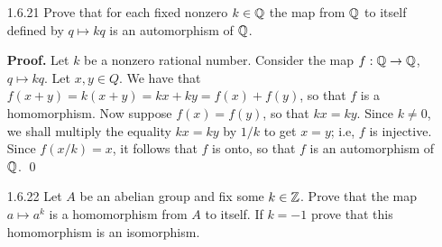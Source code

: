 \begin{enumerate}
      \textbf{Proof.}

      \textbf{Closure.} The set Aut($G$) is not empty because it contains the
      identity automorphism. So let $\alpha, \gamma \in \text{Aut}(G)$. Since
      the composition of two bijective functions is also bijective, it follows 
      that $\alpha \circ \gamma$ is bijective. Now let $x, y \in G$. It follows 
      that
      $$(\alpha\circ\gamma)(xy) = \alpha(\gamma(xy)) =
         \alpha(\gamma(x)\gamma(y)) = \alpha(\gamma(x))\alpha(\gamma(y)) =
         ((\alpha\circ\gamma)(x))((\alpha\circ\gamma)(y)),$$
      so that $(\alpha\circ\gamma)$ is also an isomorphism on $G$, and thus,
      Aut($G$) is closed.

      \textbf{Associativity.} This follows from the associativity of functions.

      \textbf{Identity.} The identity map is the identity of Aut($G$).

      \textbf{Inverse.} Let $\alpha \in \text{Aut}(G)$. Since $\alpha$ is 
      bijective, $\alpha^{-1}$ exists. It remains to show that $\alpha^{-1}$ is
      an isomorphism. Let $x, y \in G$. Since $\alpha$ is a bijection, there 
      exist unique $a, b \in G$ such that $\alpha(a) = x$ and $\alpha(b) = y$. 
      Since $\alpha$ is a homomorphism, we have that
      $xy = \alpha(a)\alpha(b) = \alpha(ab)$, so that $\alpha^{-1}(xy) = ab$.
      Hence,
      $$\alpha^{-1}(xy) = ab = \alpha^{-1}(x)\alpha^{-1}(y),$$
      so that $\alpha^{-1}$ is also an isomorphism, and thus it is in Aut($G$).
      Conclude that Aut($G$) is a group under composition. \qed      
   \item[1.6.21]  Prove that for each fixed nonzero $k \in \mathbb{Q}$ the map from $\mathbb{Q}$
                  to itself defined by $q \mapsto kq$ is an automorphism of
                  $\mathbb{Q}$.

      \textbf{Proof.} Let $k$ be a nonzero rational number. Consider the map
      $f : \mathbb{Q} \rightarrow \mathbb{Q}$, $q \mapsto kq$. Let $x, y \in Q$. We have that
      $f(x + y) = k(x + y) = kx + ky = f(x) + f(y)$, so that $f$ is a 
      homomorphism. Now suppose $f(x) = f(y)$, so that $kx = ky$. Since
      $k \neq 0$, we shall multiply the equality $kx = ky$ by $1/k$ to get
      $x = y$; i.e, $f$ is injective. Since $f(x/k) = x$, it follows that $f$ is
      onto, so that $f$ is an automorphism of $\mathbb{Q}$. \qed
   \item[1.6.22]  Let $A$ be an abelian group and fix some $k \in \mathbb{Z}$. Prove
                  that the map $a \mapsto a^k$ is a homomorphism from $A$ to 
                  itself. If $k = -1$ prove that this homomorphism is an
                  isomorphism.


\end{enumerate}
